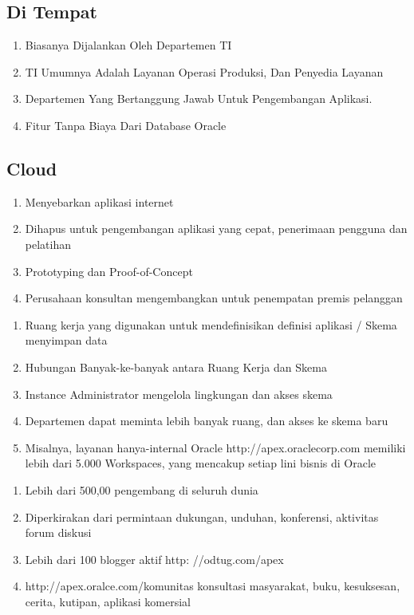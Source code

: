 \documentclass{article}
\begin{document}
\subsection{Di Tempat}
\begin{enumerate}
    \item Biasanya Dijalankan Oleh Departemen TI
    \item TI Umumnya Adalah Layanan Operasi Produksi, Dan Penyedia Layanan
    \item Departemen Yang Bertanggung Jawab Untuk Pengembangan Aplikasi.
    \item Fitur Tanpa Biaya Dari Database Oracle
    \end{enumerate}
\subsection{Cloud}
\begin{enumerate}
    \item Menyebarkan aplikasi internet
    \item Dihapus untuk pengembangan aplikasi yang cepat, penerimaan pengguna dan pelatihan
    \item Prototyping dan Proof-of-Concept \item Perusahaan konsultan mengembangkan untuk penempatan premis pelanggan
    \end{enumerate}
    


\begin{enumerate}
    \item Ruang kerja yang digunakan untuk mendefinisikan definisi aplikasi / Skema menyimpan data
    \item Hubungan Banyak-ke-banyak antara Ruang Kerja dan Skema
    \item Instance Administrator mengelola lingkungan dan akses skema
    \item Departemen dapat meminta lebih banyak ruang, dan akses ke skema baru
    \item Misalnya, layanan hanya-internal Oracle http://apex.oraclecorp.com memiliki lebih dari 5.000 Workspaces, yang mencakup setiap lini bisnis di Oracle
    \end{enumerate}
    

\begin{enumerate}
    \item Lebih dari 500,00 pengembang di seluruh dunia
    \item Diperkirakan dari permintaan dukungan, unduhan, konferensi, aktivitas forum diskusi
    \item Lebih dari 100 blogger aktif http: //odtug.com/apex
    \item http://apex.oralce.com/komunitas konsultasi masyarakat, buku, kesuksesan, cerita, kutipan, aplikasi komersial
    \end{enumerate}
    
\end{document}
